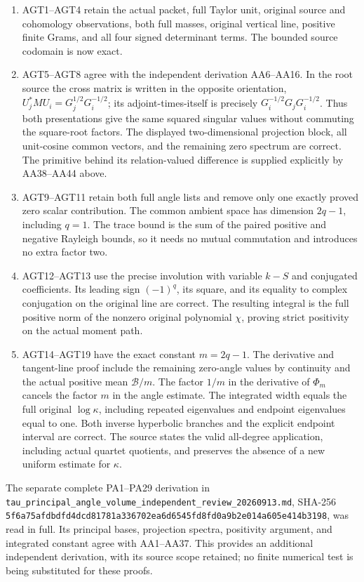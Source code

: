 \begin{enumerate}
\def\labelenumi{\arabic{enumi}.}
\tightlist
\item
  AGT1--AGT4 retain the actual packet, full Taylor unit, original source and cohomology observations, both full masses, original vertical line, positive finite Grams, and all four signed determinant terms. The bounded source codomain is now exact.
\item
  AGT5--AGT8 agree with the independent derivation AA6--AA16. In the root source the cross matrix is written in the opposite orientation, \(U_j^*MU_i=G_j^{1/2}G_i^{-1/2}\); its adjoint-times-itself is precisely \(G_i^{-1/2}G_jG_i^{-1/2}\). Thus both presentations give the same squared singular values without commuting the square-root factors. The displayed two-dimensional projection block, all unit-cosine common vectors, and the remaining zero spectrum are correct. The primitive behind its relation-valued difference is supplied explicitly by AA38--AA44 above.
\item
  AGT9--AGT11 retain both full angle lists and remove only one exactly proved zero scalar contribution. The common ambient space has dimension \(2q-1\), including \(q=1\). The trace bound is the sum of the paired positive and negative Rayleigh bounds, so it needs no mutual commutation and introduces no extra factor two.
\item
  AGT12--AGT13 use the precise involution with variable \(k-S\) and conjugated coefficients. Its leading sign \((-1)^q\), its square, and its equality to complex conjugation on the original line are correct. The resulting integral is the full positive norm of the nonzero original polynomial \(\chi\), proving strict positivity on the actual moment path.
\item
  AGT14--AGT19 have the exact constant \(m=2q-1\). The derivative and tangent-line proof include the remaining zero-angle values by continuity and the actual positive mean \(\mathcal B/m\). The factor \(1/m\) in the derivative of \(\Phi_m\) cancels the factor \(m\) in the angle estimate. The integrated width equals the full original \(\log\kappa\), including repeated eigenvalues and endpoint eigenvalues equal to one. Both inverse hyperbolic branches and the explicit endpoint interval are correct. The source states the valid all-degree application, including actual quartet quotients, and preserves the absence of a new uniform estimate for \(\kappa\).
\end{enumerate}

The separate complete PA1--PA29 derivation in \nolinkurl{tau_principal_angle_volume_independent_review_20260913.md}, SHA-256 \nolinkurl{5f6a75afdbdfd4dcd81781a336702ea6d6545fd8fd0a9b2e014a605e414b3198}, was read in full. Its principal bases, projection spectra, positivity argument, and integrated constant agree with AA1--AA37. This provides an additional independent derivation, with its source scope retained; no finite numerical test is being substituted for these proofs.

